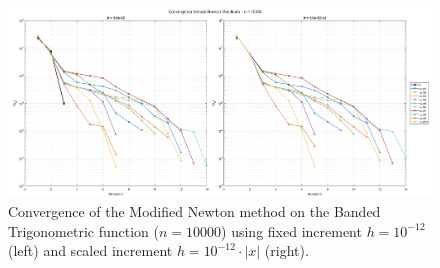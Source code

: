 \documentclass[a4paper,12pt]{article}
\begin{document}
	\begin{figure}[htbp]
		\centering
		\includegraphics[width=\textwidth]{../immagini/banded_10k_h12.png}
		\caption{Convergence of the Modified Newton method on the Banded Trigonometric function ($n=10000$) using fixed increment $h = 10^{-12}$ (left) and scaled increment $h = 10^{-12}\cdot|x|$ (right).}
		\label{fig:bt_fd_10k_h12}
	\end{figure}
	\newpage\
\end{document}
